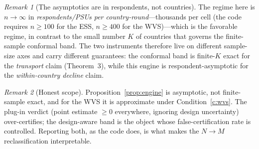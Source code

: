 \documentclass[12pt]{article}
\theoremstyle{definition}
\theoremstyle{remark}
\newtheorem{remark}{Remark}
\begin{document}
\begin{remark}[The asymptotics are in respondents, not countries]
The regime here is $n\to\infty$ in \emph{respondents/PSUs per country-round}---thousands per
cell (the code requires $n\ge100$ for the ESS, $n\ge400$ for the WVS)---which is the
favorable regime, in contrast to the small number $K$ of countries that governs the
finite-sample conformal band. The two instruments therefore live on different sample-size
axes and carry different guarantees: the conformal band is finite-$K$ exact for the
\emph{transport} claim (Theorem~3), while this engine is respondent-asymptotic for the
\emph{within-country decline} claim.
\end{remark}

\begin{remark}[Honest scope]
Proposition~\ref{prop:engine} is asymptotic, not finite-sample exact, and for the WVS it is
approximate under Condition~\ref{c:wvs}. The plug-in verdict (point estimate $\ge0$
everywhere, ignoring design uncertainty) over-certifies; the design-aware band is the object
whose false-certification rate is controlled. Reporting both, as the code does, is what makes
the $N\!\to\!M$ reclassification interpretable.
\end{remark}
\end{document}
